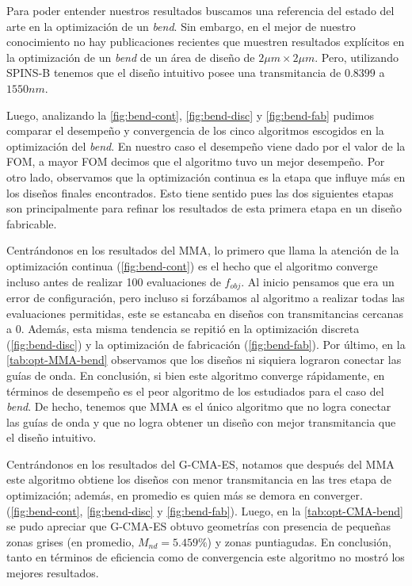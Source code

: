 Para poder entender nuestros resultados buscamos una referencia del estado del arte
en la optimización de un \emph{bend}.
Sin embargo, en el mejor de nuestro conocimiento no hay publicaciones recientes que muestren
resultados explícitos en la optimización de un \emph{bend} de un área de diseño de $2 \mu m \times 2 \mu m$.
Pero, utilizando SPINS-B tenemos que el diseño intuitivo posee una transmitancia de $0.8399$ a $1550 nm$.

Luego, analizando la \autoref{fig:bend-cont}, \autoref{fig:bend-disc} y \autoref{fig:bend-fab}
pudimos comparar el desempeño y convergencia de los cinco algoritmos escogidos 
en la optimización del \emph{bend}.
En nuestro caso el desempeño viene dado por el valor de la FOM, a mayor FOM 
decimos que el algoritmo tuvo un mejor desempeño.
Por otro lado, observamos que la optimización continua es la etapa que influye más
en los diseños finales encontrados. Esto tiene sentido pues las dos siguientes etapas
son principalmente para refinar los resultados de esta primera etapa en un diseño
fabricable.

Centrándonos en los resultados del MMA, lo primero que llama
la atención de la optimización continua (\autoref{fig:bend-cont}) es el hecho que el algoritmo converge 
incluso antes de realizar 100 evaluaciones de $f_{obj}$. 
Al inicio pensamos que era un error de configuración,
pero incluso si forzábamos al algoritmo a realizar todas las evaluaciones permitidas, 
este se estancaba en diseños con transmitancias cercanas a 0.
Además, esta misma tendencia se repitió en la optimización discreta (\autoref{fig:bend-disc})
y la optimización de fabricación (\autoref{fig:bend-fab}).
Por último, en la \autoref{tab:opt-MMA-bend} observamos que los diseños 
ni siquiera lograron conectar las guías de onda.
En conclusión, si bien este algoritmo converge rápidamente, en términos de desempeño
es el peor algoritmo de los estudiados para el caso del \emph{bend}.
De hecho, tenemos que MMA es el único algoritmo que no logra conectar las guías de onda y
que no logra obtener un diseño con mejor transmitancia que el diseño intuitivo.

Centrándonos en los resultados del G-CMA-ES, notamos que después del MMA este algoritmo
obtiene los diseños con menor transmitancia en las tres etapa de optimización;
además, en promedio es quien más se demora en converger.
(\autoref{fig:bend-cont}, \autoref{fig:bend-disc} y \autoref{fig:bend-fab}).
Luego, en la \autoref{tab:opt-CMA-bend} se pudo apreciar que G-CMA-ES obtuvo geometrías 
con presencia de pequeñas zonas grises (en promedio, $M_{nd} = 5.459 \%$) y zonas puntiagudas.
En conclusión, tanto en términos de eficiencia como de convergencia este algoritmo no
mostró los mejores resultados.

